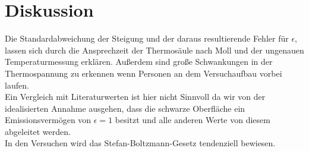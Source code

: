 \section{Diskussion}
\label{sec:Diskussion}
Die Standardabweichung der Steigung und der daraus resultierende Fehler für $\epsilon$, lassen sich durch die Ansprechzeit der Thermosäule nach Moll und der ungenauen Temperaturmessung erklären. Außerdem sind große Schwankungen in der Thermospannung zu erkennen wenn Personen an dem Versuchaufbau vorbei laufen.
\\
Ein Vergleich mit Literaturwerten ist hier nicht Sinnvoll da wir von der idealisierten Annahme ausgehen, dass die schwarze Oberfläche ein Emissionsvermögen von $\epsilon = 1$ besitzt und alle anderen Werte von diesem abgeleitet werden.
\\
In den Versuchen wird das Stefan-Boltzmann-Gesetz tendenziell bewiesen.
